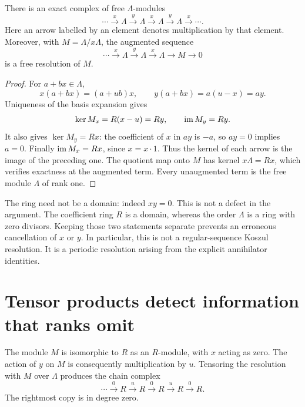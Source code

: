 \begin{proposition}\label{prop:periodic-order}
There is an exact complex of free $\Lambda$-modules
\[
 \cdots\xrightarrow{x}\Lambda\xrightarrow{y}\Lambda
 \xrightarrow{x}\Lambda\xrightarrow{y}\Lambda\xrightarrow{x}\cdots.
\]
Here an arrow labelled by an element denotes multiplication by that element.
Moreover, with $M=\Lambda/x\Lambda$, the augmented sequence
\[
 \cdots\xrightarrow{x}\Lambda\xrightarrow{y}\Lambda
 \xrightarrow{x}\Lambda\longrightarrow M\longrightarrow0
\]
is a free resolution of $M$.
\end{proposition}
\begin{proof}
For $a+bx\in\Lambda$,
\[
 x(a+bx)=(a+ub)x,\qquad y(a+bx)=a(u-x)=ay.
\]
Uniqueness of the basis expansion gives
\[
 \ker M_x=R(x-u)=Ry,\qquad \operatorname{im} M_y=Ry.
\]
It also gives $\ker M_y=Rx$: the coefficient of $x$ in $ay$ is $-a$, so
$ay=0$ implies $a=0$. Finally $\operatorname{im} M_x=Rx$, since $x=x\cdot1$. Thus the
kernel of each arrow is the image of the preceding one. The quotient map
onto $M$ has kernel $x\Lambda=Rx$, which verifies exactness at the augmented
term. Every unaugmented term is the free module $\Lambda$ of rank one.
\end{proof}

The ring need not be a domain: indeed $xy=0$. This is not a defect in the
argument. The coefficient ring $R$ is a domain, whereas the order $\Lambda$
is a ring with zero divisors. Keeping those two statements separate prevents
an erroneous cancellation of $x$ or $y$. In particular, this is not a
regular-sequence Koszul resolution. It is a periodic resolution arising from
the explicit annihilator identities.

\section{Tensor products detect information that ranks omit}

The module $M$ is isomorphic to $R$ as an $R$-module, with $x$ acting as zero.
The action of $y$ on $M$ is consequently multiplication by $u$. Tensoring the
resolution with $M$ over $\Lambda$ produces the chain complex
\[
 \cdots\xrightarrow{0}R\xrightarrow{u}R
 \xrightarrow{0}R\xrightarrow{u}R\xrightarrow{0}R.
\]
The rightmost copy is in degree zero.

